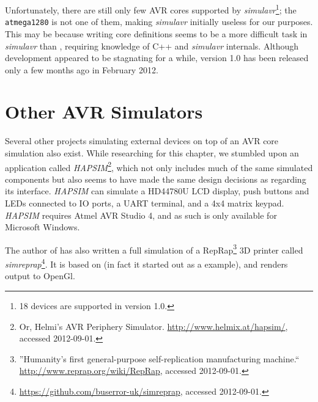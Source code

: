 Unfortunately, there are still only few \ac{AVR} cores supported by \emph{simulavr}\footnote{
%
18 devices are supported in version 1.0.
%
}; the \verb|atmega1280| is not one of them, making \emph{simulavr}
initially useless for our purposes. This may be because writing core definitions
seems to be a more difficult task in \emph{simulavr} than \simavr, requiring
knowledge of C++ and \emph{simulavr} internals.
Although development appeared to be stagnating for a while, version 1.0 has been
released only a few months ago in February 2012.

\section{Other \ac{AVR} Simulators}

Several other projects simulating external devices on top of an \ac{AVR} core
simulation also exist. While researching for this chapter, we stumbled upon
an application called \emph{HAPSIM}\footnote{
%
Or, Helmi's \ac{AVR} Periphery Simulator. \url{http://www.helmix.at/hapsim/}, accessed 2012-09-01.
%
}, which not only includes much of the same simulated components but also
seems to have made the same design decisions as \qsimavr regarding its interface.
\emph{HAPSIM} can simulate a HD44780U LCD display, push buttons and \acp{LED}
connected to \ac{IO} ports, a \ac{UART} terminal, and a 4x4 matrix keypad.
\emph{HAPSIM} requires Atmel AVR Studio 4, and as such is only available for
Microsoft Windows.

The author of \simavr has also written a full simulation of a RepRap\footnote{
%
''Humanity's first general-purpose self-replication manufacturing machine.``
\url{http://www.reprap.org/wiki/RepRap}, accessed 2012-09-01.
%
} 3D printer called \emph{simreprap}\footnote{
%
\url{https://github.com/buserror-uk/simreprap}, accessed 2012-09-01.
%
}. It is based on \simavr (in fact it started out as a \simavr example),
and renders output to OpenGl.
